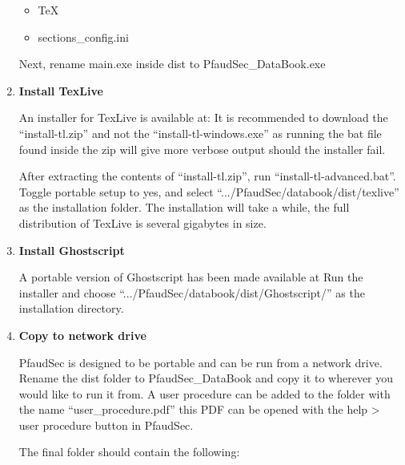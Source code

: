 \documentclass[14pt]{article}
\newcommand{\chref}[3][black]{\href{#2}{\color{#1}{#3}}}%
\newcommand{\ifolder}{\item[\faFolderOpen]}
\newcommand{\ifile}{\item[\faFileText]}
\begin{document}
\begin{flushleft}
\begin{enumerate}
\begin{tcolorbox}[boxrule=0.5pt, colback=backgrey, colframe=bordergrey, sharpish corners] 
\begin{itemize}[labelsep = 1.5em, align=center]%

\ifolder TeX
\ifile sections\_config.ini

\end{itemize}
\end{tcolorbox}

Next, rename main.exe inside dist to PfaudSec\_DataBook.exe

\item \textbf{Install TexLive}
\label{sec:depends}

An installer for TexLive is available at:
\chref[pfblue]
{https://www.tug.org/texlive/acquire-netinstall.html}
{https://www.tug.org/texlive/acquire-netinstall.html}
It is recommended to download the
``install-tl.zip'' and not the ``install-tl-windows.exe''
as running the bat file found inside the zip will give more verbose output should the installer fail.

After extracting the contents of ``install-tl.zip'', run ``install-tl-advanced.bat''.
Toggle portable setup to yes, and select ``.../PfaudSec/databook/dist/texlive'' as the installation folder.
The installation will take a while, the full distribution of TexLive is several gigabytes in size.

\item \textbf{Install Ghostscript}

A portable version of Ghostscript has been made available at
\chref[pfblue]
{https://portableapps.com/apps/utilities/ghostscript_portable}
{https://portableapps.com/apps/utilities/ghostscript\_portable}
Run the installer and choose ``.../PfaudSec/databook/dist/Ghostscript/'' as the installation directory.

\item \textbf{Copy to network drive}

PfaudSec is designed to be portable and can be run from a network drive.
Rename the dist folder to PfaudSec\_DataBook and copy it to wherever you would like to run it from.
A user procedure can be added to the folder with the name ``user\_procedure.pdf'' this PDF can be opened with the help > user procedure button in PfaudSec.

The final folder should contain the following:

\begin{tcolorbox}[boxrule=0.5pt, colback=backgrey, colframe=bordergrey, sharpish corners] 


\end{tcolorbox}
\end{enumerate}
\end{flushleft}
\end{document}
